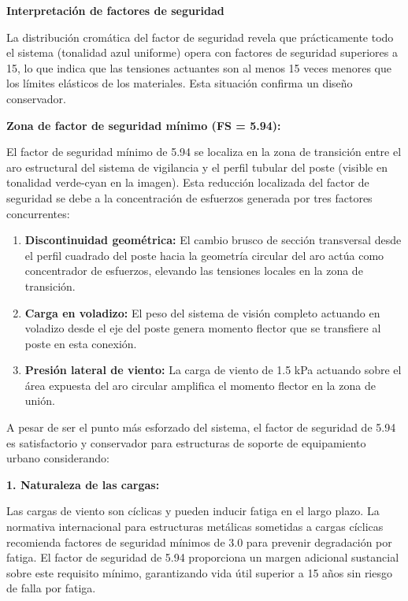 \documentclass[12pt,a4paper,oneside]{report}
\begin{document}
\textbf{Interpretación de factores de seguridad}

La distribución cromática del factor de seguridad revela que prácticamente todo el sistema (tonalidad azul uniforme) opera con factores de seguridad superiores a 15, lo que indica que las tensiones actuantes son al menos 15 veces menores que los límites elásticos de los materiales. Esta situación confirma un diseño conservador.

\textbf{Zona de factor de seguridad mínimo (FS = 5.94):}

El factor de seguridad mínimo de 5.94 se localiza en la zona de transición entre el aro estructural del sistema de vigilancia y el perfil tubular del poste (visible en tonalidad verde-cyan en la imagen). Esta reducción localizada del factor de seguridad se debe a la concentración de esfuerzos generada por tres factores concurrentes:

\begin{enumerate}
\def\labelenumi{\arabic{enumi}.}
\item
  \textbf{Discontinuidad geométrica:} El cambio brusco de sección transversal desde el perfil cuadrado del poste hacia la geometría circular del aro actúa como concentrador de esfuerzos, elevando las tensiones locales en la zona de transición.
\item
  \textbf{Carga en voladizo:} El peso del sistema de visión completo actuando en voladizo desde el eje del poste genera momento flector que se transfiere al poste en esta conexión.
\item
  \textbf{Presión lateral de viento:} La carga de viento de 1.5 kPa actuando sobre el área expuesta del aro circular amplifica el momento flector en la zona de unión.
\end{enumerate}

A pesar de ser el punto más esforzado del sistema, el factor de seguridad de 5.94 es satisfactorio y conservador para estructuras de soporte de equipamiento urbano considerando:

\textbf{1. Naturaleza de las cargas:}

Las cargas de viento son cíclicas y pueden inducir fatiga en el largo plazo. La normativa internacional para estructuras metálicas sometidas a cargas cíclicas recomienda factores de seguridad mínimos de 3.0 para prevenir degradación por fatiga. El factor de seguridad de 5.94 proporciona un margen adicional sustancial sobre este requisito mínimo, garantizando vida útil superior a 15 años sin riesgo de falla por fatiga.
\end{document}
